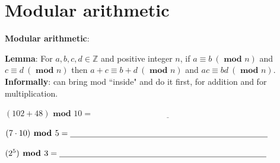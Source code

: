 \documentclass[12pt, oneside]{article}
\begin{document}
\section*{Modular arithmetic}


{\bf Modular arithmetic}: 

{\bf Lemma}: For $a, b, c, d \in \mathbb{Z}$ 
and positive integer $n$, if $a \equiv b ~(\textbf{ mod } n)$ and $c \equiv d ~(\textbf{ mod } n)$ 
then $a+c \equiv b+d ~(\textbf{ mod } n)$ and $ac \equiv bd ~(\textbf{ mod } n)$.
{\bf Informally}: can bring mod ``inside" and do it first, for addition and for multiplication.


$(102 + 48) \textbf{ mod } 10 = \underline{\phantom{\hspace{3in}}} $ 

$(7 \cdot 10) \textbf{ mod } 5 = \underline{\phantom{\hspace{3.3in}}} $ 

$(2^5) \textbf{ mod } 3 =  \underline{\phantom{\hspace{3.45in}}} $ 

\vfill

 \vfill
\end{document}
